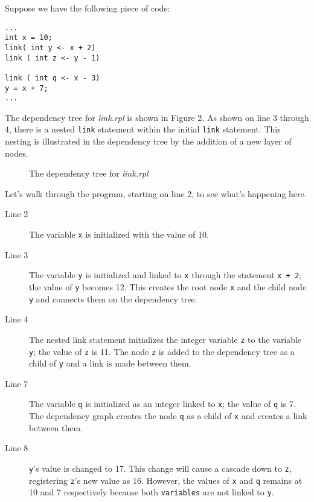 \documentclass{article}
\newcommand{\code}{\texttt}
\begin{document}
Suppose we have the following piece of code:
\begin{lstlisting}[title=\emph{link.rpl}]
...
int x = 10;
link( int y <- x + 2)
link ( int z <- y - 1)

link ( int q <- x - 3)
y = x + 7;
...
\end{lstlisting}

The dependency tree for \emph{link.rpl} is shown in Figure 2. As shown on line 3 through 4, there is a nested \code{link} statement within the initial \code{link} statement. This nesting is illustrated in the dependency tree by the addition of a new layer of nodes.

\begin{wrapfigure}{r}{0.3\textwidth}
\centering
{}
\caption{The dependency tree for \emph{link.rpl}}
\end{wrapfigure}

Let's walk through the program, starting on line 2, to see what's happening here.

\begin{description}
\item[Line 2] The variable \code{x} is initialized with the value of 10.
\item[Line 3] The variable \code{y} is initialized and linked to \code{x} through the statement \code{x + 2}; the value of \code{y} becomes 12. This creates the root node \code{x} and the child node \code{y} and connects them on the dependency tree.
\item[Line 4] The nested link statement initializes the integer variable \code{z} to the variable \code{y}; the value of \code{z} is 11. The node \code{z} is added to the dependency tree as a child of \code{y} and a link is made between them.

\item[Line 7] The variable \code{q} is initialized as an integer linked to \code{x}; the value of \code{q} is 7. The dependency graph creates the node \code{q} as a child of \code{x} and creates a link between them.
\item[Line 8] \code{y}'s value is changed to 17. This change will cause a cascade down to \code{z}, registering \code{z}'s new value as 16. However, the values of \code{x} and \code{q} remains at 10 and 7 respectively because both \code{variables} are not linked to \code{y}.
\end{description}
\end{document}
